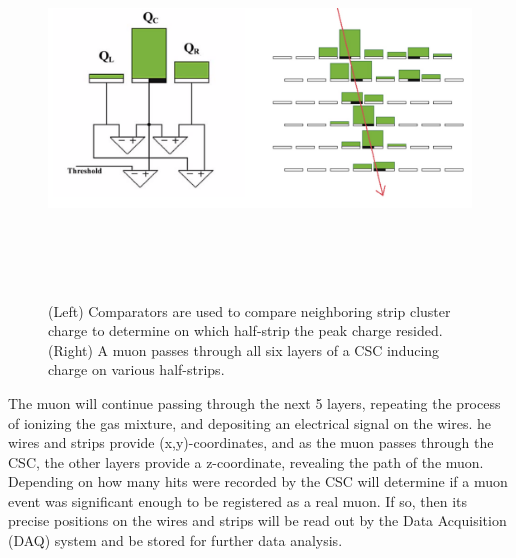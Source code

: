 \begin{figure}[pbth]
\centering
\includegraphics[width=15cm,height=10cm,keepaspectratio]{figures/cms/muonsys/csc_comparators_and_strips.png}
    \caption{
    (Left) Comparators are used to compare neighboring strip cluster charge to determine on which half-strip the peak charge resided.
    (Right) A muon passes through all six layers of a CSC inducing charge on various half-strips.
    }
    \label{fig:comparators}
\end{figure}

The muon will continue passing through the next 5 layers, repeating the process of ionizing the gas mixture, and depositing an electrical signal on the wires. 
he wires and strips provide (x,y)-coordinates, and as the muon passes through the CSC, the other layers provide a z-coordinate, revealing the path of the muon.
Depending on how many hits were recorded by the CSC will determine if a muon event was significant enough to be registered as a real muon. 
If so, then its precise positions on the wires and strips will be read out by the Data Acquisition (DAQ) system and be stored for further data analysis.


